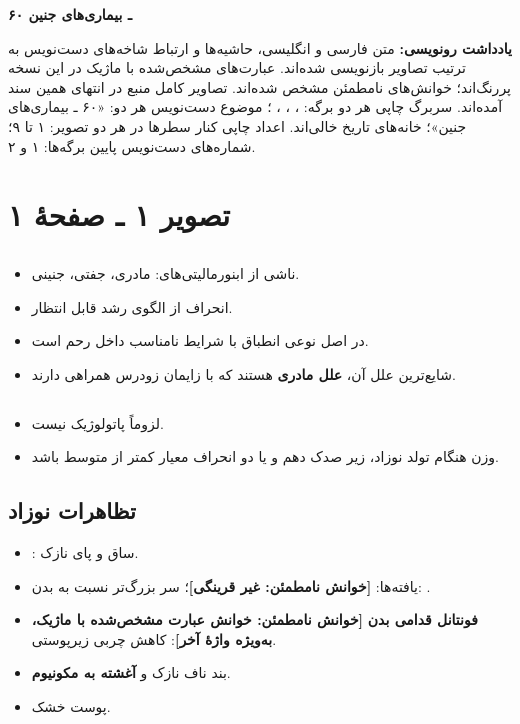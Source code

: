 \documentclass[12pt,a4paper]{article}
\begin{document}
\fi
\providecommand{\FDunclear}[1]{\textbf{[خوانش نامطمئن: #1]}}
\providecommand{\FDmark}[1]{\textbf{#1}}

\begin{center}
  {\Large\bfseries ۶۰ ـ بیماری‌های جنین}
\end{center}

\textbf{یادداشت رونویسی:}
متن فارسی و انگلیسی، حاشیه‌ها و ارتباط شاخه‌های دست‌نویس به ترتیب تصاویر بازنویسی شده‌اند.
عبارت‌های مشخص‌شده با ماژیک در این نسخه پررنگ‌اند؛ خوانش‌های نامطمئن مشخص شده‌اند.
تصاویر کامل منبع در انتهای همین سند آمده‌اند.
سربرگ چاپی هر دو برگه: ، ، ، ؛
موضوع دست‌نویس هر دو: «۶۰ ـ بیماری‌های جنین»؛ خانه‌های تاریخ خالی‌اند.
اعداد چاپی کنار سطرها در هر دو تصویر: ۱ تا ۹؛ شماره‌های دست‌نویس پایین برگه‌ها: ۱ و ۲.

\section*{تصویر ۱ ـ صفحهٔ ۱}
\subsection*{}
\begin{itemize}
  \item ناشی از ابنورمالیتی‌های: مادری، جفتی، جنینی.
  \item انحراف از الگوی رشد قابل انتظار.
  \item در اصل نوعی انطباق با شرایط نامناسب داخل رحم است.
  \item شایع‌ترین علل آن، \FDmark{علل مادری} هستند که با زایمان زودرس همراهی دارند.
\end{itemize}

\subsection*{}
\begin{itemize}
  \item لزوماً پاتولوژیک نیست.
  \item وزن هنگام تولد نوزاد، زیر صدک دهم و یا دو انحراف معیار کمتر از متوسط باشد.
\end{itemize}

\subsection*{تظاهرات نوزاد }
\begin{itemize}
  \item \FDmark{}: ساق و پای نازک.
  \item یافته‌ها: \FDunclear{غیر قرینگی}؛ سر بزرگ‌تر نسبت به بدن: \FDmark{}.
  \item \FDmark{فونتانل قدامی بدن} \FDunclear{خوانش عبارت مشخص‌شده با ماژیک، به‌ویژه واژهٔ آخر}: کاهش چربی زیرپوستی.
  \item بند ناف نازک و \FDmark{آغشته به مکونیوم}.
  \item پوست خشک.
\end{itemize}
\end{document}
